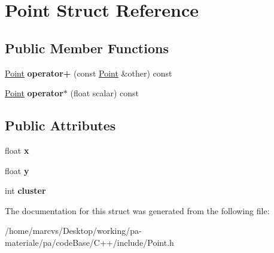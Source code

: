 \hypertarget{structPoint}{
\section{Point Struct Reference}
\label{structPoint}
}
\subsection*{Public Member Functions}
\begin{DoxyCompactItemize}
\item 
\hypertarget{structPoint_a4029dafac92f8e2cf955c10ef64c3815}{
\hyperlink{structPoint}{Point} {\bfseries operator+} (const \hyperlink{structPoint}{Point} \&other) const }
\label{structPoint_a4029dafac92f8e2cf955c10ef64c3815}

\item 
\hypertarget{structPoint_af3165e98a5d9802804080ebaea7c66c8}{
\hyperlink{structPoint}{Point} {\bfseries operator$\ast$} (float scalar) const }
\label{structPoint_af3165e98a5d9802804080ebaea7c66c8}

\end{DoxyCompactItemize}
\subsection*{Public Attributes}
\begin{DoxyCompactItemize}
\item 
\hypertarget{structPoint_a05dfe2dfbde813ad234b514f30e662f1}{
float {\bfseries x}}
\label{structPoint_a05dfe2dfbde813ad234b514f30e662f1}

\item 
\hypertarget{structPoint_a6101960c8d2d4e8ea1d32c9234bbeb8d}{
float {\bfseries y}}
\label{structPoint_a6101960c8d2d4e8ea1d32c9234bbeb8d}

\item 
\hypertarget{structPoint_a1cc8424bc6af686e5c92c65830d06ddf}{
int {\bfseries cluster}}
\label{structPoint_a1cc8424bc6af686e5c92c65830d06ddf}

\end{DoxyCompactItemize}


The documentation for this struct was generated from the following file:\begin{DoxyCompactItemize}
\item 
/home/marcvs/Desktop/working/pa-\/materiale/pa/codeBase/C++/include/Point.h\end{DoxyCompactItemize}
